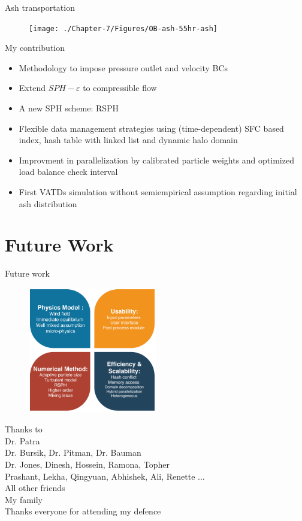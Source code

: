 \documentclass{beamer}
\begin{document}
\begin{frame}{Ash transportation}
\begin{figure}[!htb]
\begin{minipage}{.288\textwidth}
    \end{minipage}%
    \begin{minipage}{.288\textwidth}
        \centering
        \texttt{[image: ./Chapter-7/Figures/OB-ash-55hr-ash]}
    \end{minipage}%
\end{figure}
\end{frame}

\begin{frame} {My contribution}
\begin{itemize}
\item Methodology to impose pressure outlet and velocity BCs
\item Extend $SPH-\varepsilon$ to compressible flow
\item A new SPH scheme: RSPH
\item Flexible data management strategies using (time-dependent) SFC based index, hash table with linked list and dynamic halo domain
\item Improvment in parallelization by calibrated particle weights and optimized load balance check interval 
\item First VATDs simulation without semiempirical assumption regarding initial ash distribution
\end{itemize}
\end{frame}
\section{Future Work}
\begin{frame} {Future work}
\begin{figure}
	\includegraphics[width=0.5\textwidth]{./PPT/Future-Work}
\end{figure}
\end{frame}
%
\begin{frame}{}
\center
\huge{
Thanks to \\}
\Large
{
Dr. Patra \\
Dr. Bursik, Dr. Pitman, Dr. Bauman \\
Dr. Jones, Dinesh, Hossein, Ramona, Topher \\
Prashant, Lekha, Qingyuan, Abhishek, Ali, Renette ...\\
All other friends \\
My family \\
Thanks everyone for attending my defence
}
\end{frame}
\end{document}
